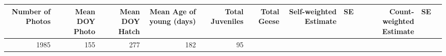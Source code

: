 \documentclass[]{article}
\begin{document}
\begin{longtable}[]{@{}rrrrrrrrrrr@{}}
\begin{minipage}[b]{0.07\columnwidth}
\textbf{Number of Photos}\strut
\end{minipage} & \begin{minipage}[b]{0.07\columnwidth}\raggedleft\strut
\textbf{Mean DOY Photo}\strut
\end{minipage} & \begin{minipage}[b]{0.07\columnwidth}\raggedleft\strut
\textbf{Mean DOY Hatch}\strut
\end{minipage} & \begin{minipage}[b]{0.07\columnwidth}\raggedleft\strut
\textbf{Mean Age of young (days)}\strut
\end{minipage} & \begin{minipage}[b]{0.07\columnwidth}\raggedleft\strut
\textbf{Total Juveniles}\strut
\end{minipage} & \begin{minipage}[b]{0.05\columnwidth}\raggedleft\strut
\textbf{Total Geese}\strut
\end{minipage} & \begin{minipage}[b]{0.09\columnwidth}\raggedleft\strut
\textbf{Self-weighted Estimate}\strut
\end{minipage} & \begin{minipage}[b]{0.05\columnwidth}\raggedleft\strut
\textbf{SE}\strut
\end{minipage} & \begin{minipage}[b]{0.10\columnwidth}\raggedleft\strut
\textbf{Count-weighted Estimate}\strut
\end{minipage} & \begin{minipage}[b]{0.04\columnwidth}\raggedleft\strut
\textbf{SE}\strut
\end{minipage}\tabularnewline
\midrule
\endhead
\begin{minipage}[t]{0.06\columnwidth}\raggedleft\strut
1985\strut
\end{minipage} & \begin{minipage}[t]{0.07\columnwidth}\raggedleft\strut
155\strut
\end{minipage} & \begin{minipage}[t]{0.07\columnwidth}\raggedleft\strut
277\strut
\end{minipage} & \begin{minipage}[t]{0.07\columnwidth}\raggedleft\strut
182\strut
\end{minipage} & \begin{minipage}[t]{0.07\columnwidth}\raggedleft\strut
95\strut
\end{minipage} & \begin{minipage}[t]{0.07\columnwidth}\raggedleft\strut

\end{minipage}
\end{longtable}
\end{document}
